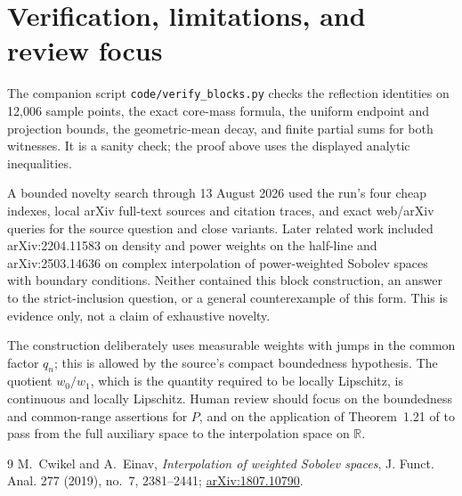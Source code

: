 \documentclass[11pt]{article}
\theoremstyle{remark}
\newcommand{\R}{\mathbb R}
\begin{document}
\section{Verification, limitations, and review focus}

The companion script \texttt{code/verify\_blocks.py} checks the reflection
identities on 12,006 sample points, the exact core-mass formula, the uniform
endpoint and projection bounds, the geometric-mean decay, and finite partial
sums for both witnesses.  It is a sanity check; the proof above uses the
displayed analytic inequalities.

A bounded novelty search through 13 August 2026 used the run's four cheap
indexes, local arXiv full-text sources and citation traces, and exact web/arXiv
queries for the source question and close variants.  Later related work
included arXiv:2204.11583 on density and power weights on the half-line and
arXiv:2503.14636 on complex interpolation of power-weighted Sobolev spaces
with boundary conditions.  Neither contained this block construction, an
answer to the strict-inclusion question, or a general counterexample of this
form.  This is evidence only, not a claim of exhaustive novelty.

The construction deliberately uses measurable weights with jumps in the
common factor $q_n$; this is allowed by the source's compact boundedness
hypothesis.  The quotient $w_0/w_1$, which is the quantity required to be
locally Lipschitz, is continuous and locally Lipschitz.  Human review should
focus on the boundedness and common-range assertions for $P$, and on the
application of Theorem~1.21 of \cite{CE} to pass from the full auxiliary space
to the interpolation space on $\R$.

\begin{thebibliography}{9}
M.~Cwikel and A.~Einav,
\emph{Interpolation of weighted Sobolev spaces},
J. Funct. Anal. 277 (2019), no.~7, 2381--2441;
\href{https://arxiv.org/abs/1807.10790}{arXiv:1807.10790}.
\end{thebibliography}
\end{document}
